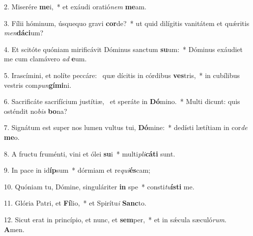 2. Miserére \textbf{me}i,~*  et exáudi oratió\textit{nem} \textbf{me}am.\

3. Fílii hóminum, úsquequo gravi \textbf{cor}de?~*  ut quid dilígitis vanitátem et quǽritis \textit{men}\textbf{dá}\textbf{ci}um?\

4. Et scitóte quóniam mirificávit Dóminus sanctum \textbf{su}um:~*  Dóminus exáudiet me cum clamávero \textit{ad} \textbf{e}um.\

5. Irascímini, et nolíte peccáre: \dag\  quæ dícitis in córdibus \textbf{ves}tris,~*  in cubílibus vestris com\textit{pun}\textbf{gí}\textbf{mi}ni.\

6. Sacrificáte sacrifícium justítiæ, \dag\  et speráte in \textbf{Dó}mino.~*  Multi dicunt: quis osténdit no\textit{bis} \textbf{bo}na?\

7. Signátum est super nos lumen vultus tui, \textbf{Dó}mine:~*  dedísti lætítiam in cor\textit{de} \textbf{me}o.\

8. A fructu fruménti, vini et ólei \textbf{su}i~*  multi\textit{pli}\textbf{cá}\textbf{ti} sunt.\

9. In pace in id\textbf{íp}sum~*  dórmiam et re\textit{qui}\textbf{és}cam;\

10. Quóniam tu, Dómine, singuláriter \textbf{in} spe~*  consti\textit{tu}\textbf{ís}\textbf{ti} me.\

11. Glória Patri, et \textbf{Fí}lio,~*  et Spirítu\textit{i} \textbf{Sanc}to.\

12. Sicut erat in princípio, et nunc, et \textbf{sem}per,~*  et in sǽcula sæculó\textit{rum}. \textbf{A}men.\

